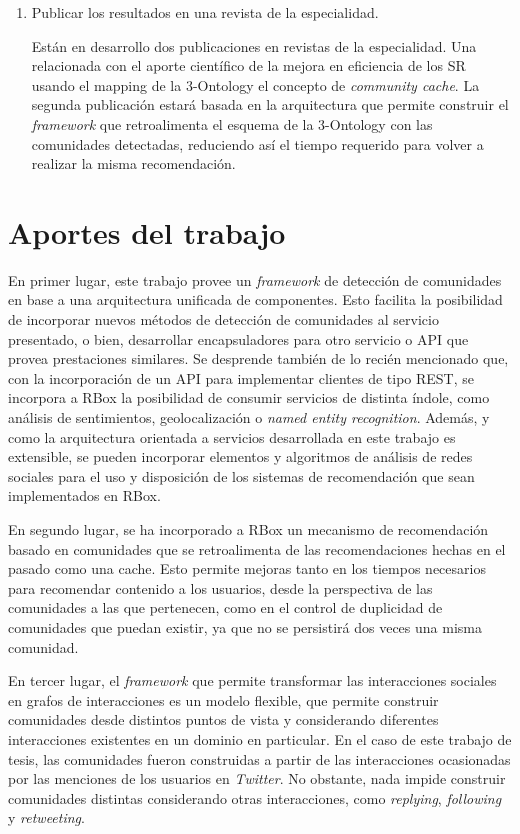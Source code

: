\begin{enumerate}
  \item Publicar los resultados en una revista de la especialidad. \newline

  Están en desarrollo dos publicaciones en revistas de la especialidad. Una relacionada con el aporte científico de la mejora en eficiencia de los SR usando el mapping de la 3-Ontology el concepto de \textit{community cache}. La segunda publicación estará basada en la arquitectura que permite construir el \textit{framework} que retroalimenta el esquema de la 3-Ontology con las comunidades detectadas, reduciendo así el tiempo requerido para volver a realizar la misma recomendación. \newline

\end{enumerate}

\section{Aportes del trabajo}

En primer lugar, este trabajo provee un \textit{framework} de detección de comunidades en base a una arquitectura unificada de componentes. Esto facilita la posibilidad de incorporar nuevos métodos de detección de comunidades al servicio presentado, o bien, desarrollar encapsuladores para otro servicio o API que provea prestaciones similares. Se desprende también de lo recién mencionado que, con la incorporación de un API para implementar clientes de tipo REST, se incorpora a RBox la posibilidad de consumir servicios de distinta índole, como análisis de sentimientos, geolocalización o \textit{named entity recognition}. Además, y como la arquitectura orientada a servicios desarrollada en este trabajo es extensible, se pueden incorporar elementos y algoritmos de análisis de redes sociales para el uso y disposición de los sistemas de recomendación que sean implementados en RBox.

En segundo lugar, se ha incorporado a RBox un mecanismo de recomendación basado en comunidades que se retroalimenta de las recomendaciones hechas en el pasado como una cache. Esto permite mejoras tanto en los tiempos necesarios para recomendar contenido a los usuarios, desde la perspectiva de las comunidades a las que pertenecen, como en el control de duplicidad de comunidades que puedan existir, ya que no se persistirá dos veces una misma comunidad.

En tercer lugar, el \textit{framework} que permite transformar las interacciones sociales en grafos de interacciones es un modelo flexible, que permite construir comunidades desde distintos puntos de vista y considerando diferentes interacciones existentes en un dominio en particular. En el caso de este trabajo de tesis, las comunidades fueron construidas a partir de las interacciones ocasionadas por las menciones de los usuarios en \textit{Twitter}. No obstante, nada impide construir comunidades distintas considerando otras interacciones, como \textit{replying}, \textit{following} y \textit{retweeting}.

